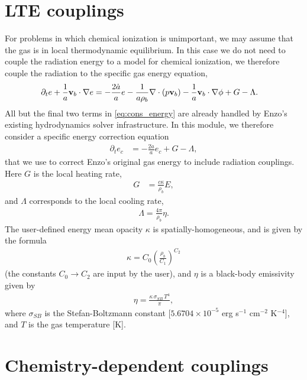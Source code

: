 \documentclass[letterpaper,10pt]{article}
\renewcommand{\(}{\left(}
\renewcommand{\)}{\right)}
\newcommand{\vb}{{\bf v}_b}
\newcommand{\rhob}{\rho_b}
\begin{document}
\section{LTE couplings}
\label{sec:lte_model}

For problems in which chemical ionization is unimportant, we may
assume that the gas is in local thermodynamic equilibrium.  In this
case we do not need to couple the radiation energy to a model for
chemical ionization, we therefore couple the radiation to the specific
gas energy equation, 
\begin{align}
  \label{eq:cons_energy}
  \partial_t e + \frac1a\vb\cdot\nabla e &=
    - \frac{2\dot{a}}{a}e
    - \frac{1}{a\rhob}\nabla\cdot\left(p\vb\right) 
    - \frac1a\vb\cdot\nabla\phi + G - \Lambda.
\end{align}
All but the final two terms in \eqref{eq:cons_energy} are already
handled by Enzo's existing hydrodynamics solver infrastructure.  In
this module, we therefore consider a specific energy correction equation 
\begin{align}
  \label{eq:cons_energy_correction}
  \partial_t e_c &= -\frac{2\dot{a}}{a}e_c + G - \Lambda,
\end{align}
that we use to correct Enzo's original gas energy to include radiation
couplings.  Here $G$ is the local heating rate,
\begin{align}
\label{eq:G_LTE}
  G &= \frac{c \kappa}{\rhob} E,
\end{align}
and $\Lambda$ corresponds to the local cooling rate,
\begin{align}
\label{eq:Lambda_LTE}
  \Lambda = \frac{4\pi}{\rhob} \eta.
\end{align}
The user-defined energy mean opacity $\kappa$ is
spatially-homogeneous, and is given by the formula
\begin{align}
\label{eq:opacityE}
  \kappa = C_0 \left(\frac{\rhob}{C_1}\right)^{C_2}
\end{align}
(the constants $C_0\to C_2$ are input by the user), and $\eta$ is
a black-body emissivity given by 
\begin{align}
\label{eq:etaBB}
  \eta = \frac{\kappa\,\sigma_{SB}\,T^4}{\pi},
\end{align}
where $\sigma_{SB}$ is the Stefan-Boltzmann constant [$5.6704\times
10^{-5}$ erg s$^{-1}$ cm$^{-2}$ K$^{-4}$], and $T$ is the gas
temperature [K]. 



\section{Chemistry-dependent couplings}
\label{sec:chem_model}
\end{document}
